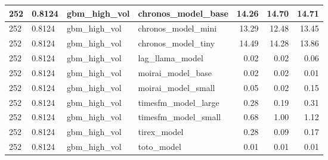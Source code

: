 {\begin{tabular}{llllrrr}
\midrule
252 & 0.8124 & gbm\_high\_vol & chronos\_model\_base & 14.26 & 14.70 & 14.71 \\
\midrule
252 & 0.8124 & gbm\_high\_vol & chronos\_model\_mini & 13.29 & 12.48 & 13.45 \\
\midrule
252 & 0.8124 & gbm\_high\_vol & chronos\_model\_tiny & 14.49 & 14.28 & 13.86 \\
\midrule
252 & 0.8124 & gbm\_high\_vol & lag\_llama\_model & 0.02 & 0.02 & 0.06 \\
\midrule
252 & 0.8124 & gbm\_high\_vol & moirai\_model\_base & 0.02 & 0.02 & 0.01 \\
\midrule
252 & 0.8124 & gbm\_high\_vol & moirai\_model\_small & 0.05 & 0.02 & 0.15 \\
\midrule
252 & 0.8124 & gbm\_high\_vol & timesfm\_model\_large & 0.28 & 0.19 & 0.31 \\
\midrule
252 & 0.8124 & gbm\_high\_vol & timesfm\_model\_small & 0.68 & 1.00 & 1.12 \\
\midrule
252 & 0.8124 & gbm\_high\_vol & tirex\_model & 0.28 & 0.09 & 0.17 \\
\midrule
252 & 0.8124 & gbm\_high\_vol & toto\_model & 0.01 & 0.01 & 0.01 \\
\bottomrule
\end{tabular}
}